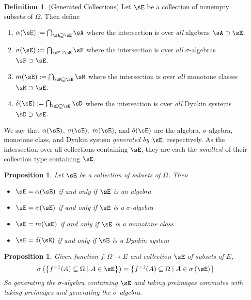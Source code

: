 \documentclass[12pt]{article}
\theoremstyle{plain}
\newtheorem{prop}[thm]{Proposition}
\theoremstyle{definition}
\newtheorem{defn}[thm]{Definition}
\theoremstyle{remark}
\newcommand{\ra}{\rightarrow}
\begin{document}
\begin{defn}(Generated Collections)
Let $\sE$ be a collection of nonempty subsets of $\Omega$. Then
define
\begin{enumerate}
  \item $\alpha(\sE) := \bigcap_{\sA \supseteq \sE} \sA$
    where the intersection is over \emph{all} algebras $\sA\supset \sE$.
  \item $\sigma(\sE) := \bigcap_{\sF \supseteq \sE} \sF$
    where the intersection is over \emph{all} $\sigma$-algebras
    $\sF\supset \sE$.
  \item $m(\sE) := \bigcap_{\sM \supseteq \sE} \sM$
    where the intersection is over \emph{all} monotone classes
    $\sM\supset \sE$.
  \item $\delta(\sE) := \bigcap_{\sD \supseteq \sE} \sD$
    where the intersection is over \emph{all} Dynkin systems
    $\sD\supset \sE$.
\end{enumerate}
We say that $\alpha(\sE)$, $\sigma(\sE)$, $m(\sE)$, and $\delta(\sE)$
are the algebra, $\sigma$-algebra, monotone class, and Dynkin system
\emph{generated by $\sE$}, respectively. As the intersection over all
collections containing $\sE$, they are each the \emph{smallest} of their
collection type containing $\sE$.
\end{defn}


\begin{prop}
Let $\sE$ be a collection of subsets of $\Omega$. Then
\begin{itemize}
  \item $\sE=\alpha(\sE)$ if and only if $\sE$ is an algebra
  \item $\sE=\sigma(\sE)$ if and only if $\sE$ is a $\sigma$-algebra
  \item $\sE=m(\sE)$ if and only if $\sE$ is a monotone class
  \item $\sE=\delta(\sE)$ if and only if $\sE$ is a Dynkin system
\end{itemize}
\end{prop}

\begin{prop}
\label{prop:gensigal}
Given function $f:\Omega\ra E$ and collection $\sE$ of subsets of $E$,
\begin{align}
  \sigma\left( \left\{ f^{-1}(A) \subseteq\Omega\;|\; A\in\sE \right\} \right)
  =
  \left\{ f^{-1}(A) \subseteq\Omega\;|\; A\in\sigma\left( \sE \right)\right\}
  \label{eq:gensigal}
\end{align}
So generating the $\sigma$-algebra containing $\sE$ and taking
preimages \emph{commutes} with taking preimages and generating the
$\sigma$-algebra.
\end{prop}
\end{document}
